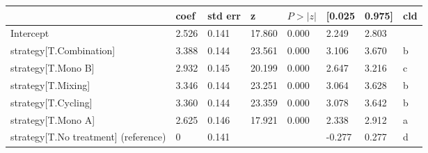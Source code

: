 \begin{tabular}{llllllll}
\toprule
 & coef & std err & z & $P>|z|$ & [0.025 & 0.975] & cld \\
\midrule
Intercept & 2.526 & 0.141 &    17.860 &  0.000 & 2.249 & 2.803 &  \\
strategy[T.Combination] & 3.388 & 0.144 &    23.561 &  0.000 & 3.106 & 3.670 & b \\
strategy[T.Mono B] & 2.932 & 0.145 &    20.199 &  0.000 & 2.647 & 3.216 & c \\
strategy[T.Mixing] & 3.346 & 0.144 &    23.251 &  0.000 & 3.064 & 3.628 & b \\
strategy[T.Cycling] & 3.360 & 0.144 &    23.359 &  0.000 & 3.078 & 3.642 & b \\
strategy[T.Mono A] & 2.625 & 0.146 &    17.921 &  0.000 & 2.338 & 2.912 & a \\
strategy[T.No treatment] (reference) & 0 & 0.141 &  &  & -0.277 & 0.277 & d \\
\bottomrule
\end{tabular}
